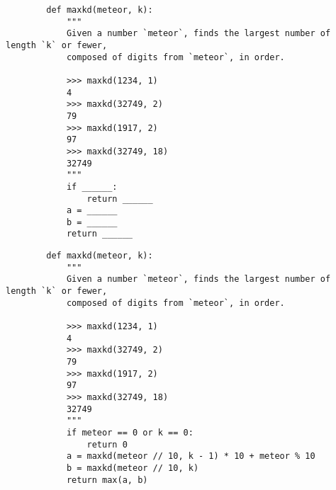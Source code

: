 \documentclass{exam}
\begin{document}
    \begin{blocksection}
        \begin{lstlisting}
        def maxkd(meteor, k):
            """
            Given a number `meteor`, finds the largest number of length `k` or fewer,
            composed of digits from `meteor`, in order.
        
            >>> maxkd(1234, 1)
            4
            >>> maxkd(32749, 2)
            79
            >>> maxkd(1917, 2)
            97
            >>> maxkd(32749, 18)
            32749
            """
            if ______:
                return ______
            a = ______
            b = ______
            return ______
        \end{lstlisting}
    \end{blocksection}
    \begin{solution}
        \begin{lstlisting}
        def maxkd(meteor, k):
            """
            Given a number `meteor`, finds the largest number of length `k` or fewer,
            composed of digits from `meteor`, in order.

            >>> maxkd(1234, 1)
            4
            >>> maxkd(32749, 2)
            79
            >>> maxkd(1917, 2)
            97
            >>> maxkd(32749, 18)
            32749
            """
            if meteor == 0 or k == 0:
                return 0
            a = maxkd(meteor // 10, k - 1) * 10 + meteor % 10
            b = maxkd(meteor // 10, k)
            return max(a, b)
        \end{lstlisting}
    \end{solution}
\end{document}
